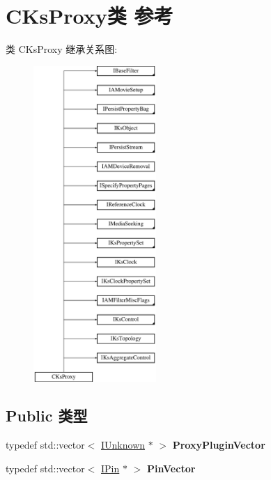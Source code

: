 \hypertarget{class_c_ks_proxy}{}\section{C\+Ks\+Proxy类 参考}
\label{class_c_ks_proxy}
类 C\+Ks\+Proxy 继承关系图\+:\begin{figure}[H]
\begin{center}
\leavevmode
\includegraphics[height=12.000000cm]{class_c_ks_proxy}
\end{center}
\end{figure}
\subsection*{Public 类型}
\begin{DoxyCompactItemize}
\item 
\mbox{\label{class_c_ks_proxy_a950b1470410a42634e72610512f7e519}} 
typedef std\+::vector$<$ \hyperlink{interface_i_unknown}{I\+Unknown} $\ast$ $>$ {\bfseries Proxy\+Plugin\+Vector}
\item 
\mbox{\label{class_c_ks_proxy_a334e6bc0ba31aa72000a6471db481bba}} 
typedef std\+::vector$<$ \hyperlink{interface_i_pin}{I\+Pin} $\ast$ $>$ {\bfseries Pin\+Vector}
\end{DoxyCompactItemize}
